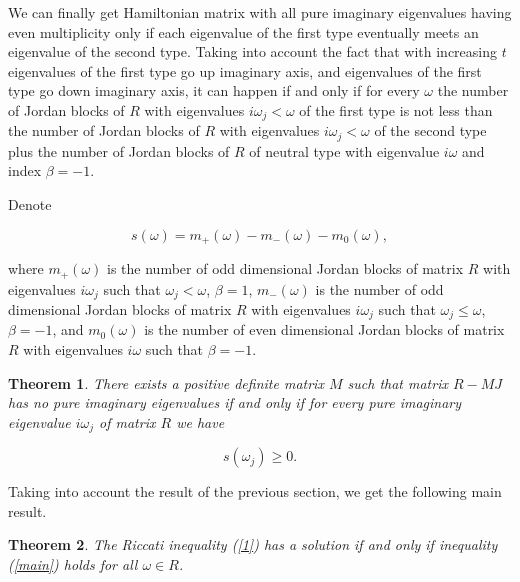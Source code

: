\documentclass[11pt, reqno]{amsart}
\theoremstyle{plain}
\newtheorem{theorem}{Theorem}[section]
\begin{document}
We can finally get Hamiltonian matrix with all pure imaginary eigenvalues having even multiplicity only if each eigenvalue of the first type eventually meets an eigenvalue of the second type. Taking into account the fact that with increasing $t$ eigenvalues of the first type go up imaginary axis, and eigenvalues of the first type go down imaginary axis, it can happen if and only if for every $\omega$ the number of Jordan blocks of $R$ with eigenvalues $i\omega_{j}< \omega$ of the first type is not less than the number of Jordan blocks of $R$ with eigenvalues $i\omega_{j}< \omega$ of the second type plus the number of Jordan blocks of $R$ of neutral type with eigenvalue $i\omega$ and index $\beta=-1$. 

Denote 

$$ s(\omega) = m_{+}(\omega)- m_{-}(\omega) - m_{0}(\omega),$$

\noindent where $m_{+}(\omega)$ is the number of odd dimensional Jordan blocks of matrix $R$ with eigenvalues $ i\omega_{j}$ such that $\omega_{j}<\omega$, $\beta=1$,  $m_{-}(\omega)$ is the number of odd dimensional Jordan blocks of matrix $R$ with eigenvalues $ i\omega_{j}$ such that $\omega_{j}\le \omega$, $\beta=-1$, and $m_{0}(\omega)$ is the number of even dimensional Jordan blocks of matrix $R$ with eigenvalues $ i\omega$ such that $\beta=-1$.

\begin{theorem}
There exists a positive definite matrix $M$ such that matrix $R-MJ$ has no pure imaginary eigenvalues if and only if for every pure imaginary eigenvalue $i\omega_{j}$ of matrix $R$ we have

\begin{equation}\label{main}  
s(\omega_{j})\ge 0.
\end{equation}

\end{theorem}


Taking into account the result of the previous section, we get the following main result.

\begin{theorem}
The Riccati inequality (\ref{1}) has a solution if and only if inequality (\ref{main}) holds for all $\omega\in R$.
\end{theorem}












%
%
\end{document}
